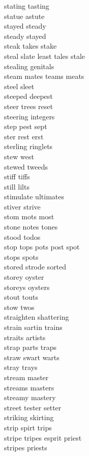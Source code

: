 stating tasting\\
statue astute\\
stayed steady\\
steady stayed\\
steak takes stake\\
steal slate least tales stale\\
stealing genitals\\
steam mates teams meats\\
steel sleet\\
steeped deepest\\
steer trees reset\\
steering integers\\
step pest sept\\
ster rest erst\\
sterling ringlets\\
stew west\\
stewed tweeds\\
stiff tiffs\\
still lilts\\
stimulate ultimates\\
stiver strive\\
stom mots most\\
stone notes tones\\
stood todos\\
stop tops pots post spot\\
stops spots\\
stored strode sorted\\
storey oyster\\
storeys oysters\\
stout touts\\
stow twos\\
straighten shattering\\
strain sartin trains\\
straits artists\\
strap parts traps\\
straw swart warts\\
stray trays\\
stream master\\
streams masters\\
streamy mastery\\
street tester setter\\
striking skirting\\
strip spirt trips\\
stripe tripes esprit priest\\
stripes priests\\
